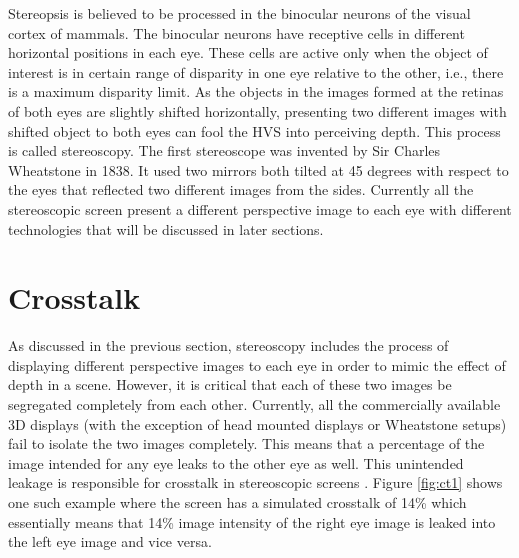 Stereopsis is believed to be processed in the binocular neurons of the visual cortex of mammals. The binocular neurons have receptive cells in different horizontal positions in each eye. These cells are active only when the object of interest is in certain range of disparity in one eye relative to the other, i.e., there is a maximum disparity limit. As the objects in the images formed at the retinas of both eyes are slightly shifted horizontally, presenting two different images with shifted object to both eyes can fool the HVS into perceiving depth. This process is called stereoscopy. The first stereoscope was invented by Sir Charles Wheatstone in 1838\cite{ wiki:wheatstone}. It used two mirrors both tilted at 45 degrees with respect to the eyes that reflected two different images from the sides. Currently all the stereoscopic screen present a different perspective image to each eye with different technologies that will be discussed in later sections.

\section{Crosstalk}
As discussed in the previous section, stereoscopy includes the process of displaying different perspective images to each eye in order to mimic the effect of depth in a scene. However, it is critical that each of these two images be segregated completely from each other. Currently, all the commercially available 3D displays (with the exception of head mounted displays or Wheatstone setups) fail to isolate the two images completely. This means that a percentage of the image intended for any eye leaks to the other eye as well. This unintended leakage is responsible for crosstalk in stereoscopic screens \cite{woods2012crosstalk}. Figure \ref{fig:ct1} shows one such example where the screen has a simulated crosstalk of 14\% which essentially means that 14\% image intensity of the right eye image is leaked into the left eye image and vice versa.

